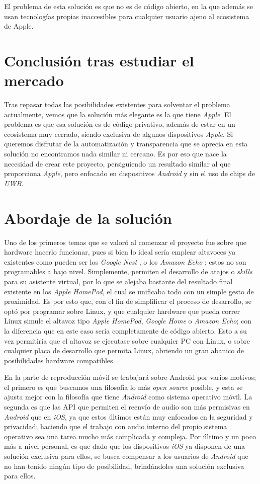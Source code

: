 El problema de esta solución es que no es de código abierto, en la que además se usan
tecnologías propias inaccesibles para cualquier usuario ajeno al ecosistema de Apple.

\section{Conclusión tras estudiar el mercado}
Tras repasar todas las posibilidades existentes para solventar el problema
actualmente, vemos que la solución más elegante es la que tiene \emph{Apple}. El
problema es que esa solución es de código privativo, además de estar en un
ecosistema muy cerrado, siendo exclusiva de algunos dispositivos \emph{Apple}.
Si queremos disfrutar de la automatización y transparencia que se aprecia en
esta solución no encontramos nada similar ni cercano. Es por eso que nace la
necesidad de crear este proyecto, persiguiendo un resultado similar al que
proporciona \emph{Apple}, pero enfocado en dispositivos \emph{Android} y sin el
uso de chips de \emph{UWB}.\\

\section{Abordaje de la solución}

Uno de los primeros temas que se valoró al comenzar el proyecto fue sobre que
hardware hacerlo funcionar, pues si bien lo ideal sería emplear altavoces ya
existentes como pueden ser los \emph{Google Nest} \cite{google-nest}, o los
\emph{Amazon Echo} \cite{amazon-echo}; estos no son
programables a bajo nivel. Simplemente, permiten el desarrollo de atajos o
\emph{skills} para su asistente virtual, por lo que se alejaba bastante del
resultado final existente en los \emph{Apple HomePod}, el cual se unificaba todo
con un simple gesto de proximidad. Es por esto que, con el fin de simplificar el
proceso de desarrollo, se optó por programar sobre Linux, y que cualquier
hardware que pueda correr Linux simule el altavoz tipo \emph{Apple HomePod},
\emph{Google Home} o \emph{Amazon Echo}; con la diferencia que en este caso
sería completamente de código abierto. Esto a su vez permitiría que el altavoz
se ejecutase sobre cualquier PC con Linux, o sobre cualquier placa de desarrollo
que permita Linux, abriendo un gran abanico de posibilidades hardware
compatibles. 

En la parte de reproducción móvil se trabajará sobre Android por varios motivos;
el primero es que buscamos una filosofía lo más \emph{open source} posible, y
esta se ajusta mejor con la filosofía que tiene \emph{Android} como sistema
operativo móvil. La segunda es que las API que permiten el reenvío de audio
\cite{api-audio-capture} son más permisivas en \emph{Android} que en \emph{iOS},
ya que estos últimos están muy enfocados en la seguridad y privacidad; haciendo
que el trabajo con audio interno del propio sistema operativo sea una tarea
mucho más complicada y compleja. Por último y un poco más a nivel personal, es
que dado que los dispositivos \emph{iOS} ya disponen de una solución exclusiva
para ellos, se busca compensar a los usuarios de \emph{Android} que no han
tenido ningún tipo de posibilidad, brindándoles una solución exclusiva para
ellos.

